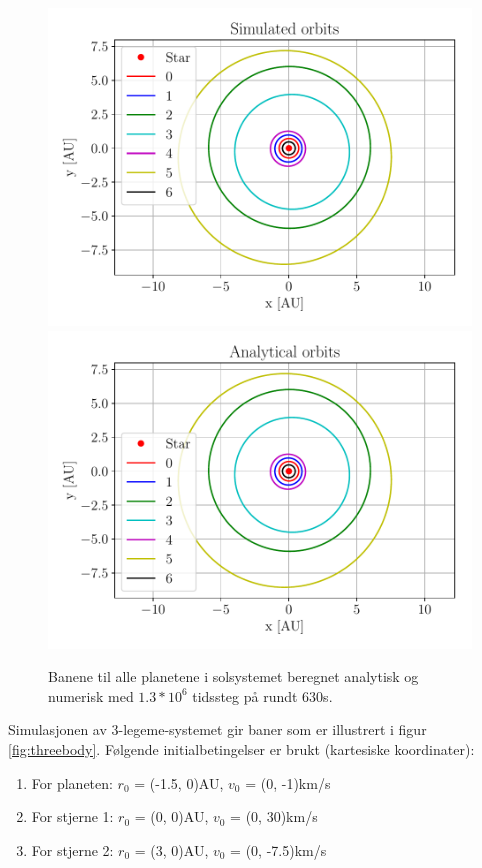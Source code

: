 \documentclass[reprint,english,notitlepage]{revtex4-1}  %
\begin{document}
 \begin{figure}[htbp]
 \includegraphics[width=\linewidth]{output/plots/orbits_calc.pdf}
 \includegraphics[width=\linewidth]{output/plots/orbits_exact.pdf}
 \caption{Banene til alle planetene i solsystemet beregnet analytisk og numerisk med $1.3 * 10^6$ tidssteg på rundt 630s. \label{fig:orbits}}
 \end{figure}

Simulasjonen av 3-legeme-systemet gir baner som er illustrert i figur \ref{fig:threebody}.
 Følgende initialbetingelser er brukt (kartesiske koordinater):
 \begin{enumerate}
   \item For planeten:
   $r_0$ = (-1.5, 0)AU,
   $v_0$ = (0, -1)km/s
   \item For stjerne 1:
   $r_0$ = (0, 0)AU,
   $v_0$ = (0, 30)km/s
   \item For stjerne 2:
   $r_0$ = (3, 0)AU,
   $v_0$ = (0, -7.5)km/s
 \end{enumerate}
\end{document}

